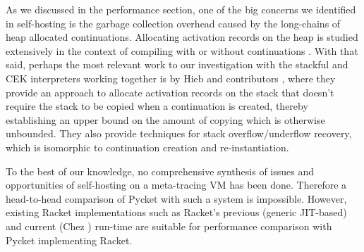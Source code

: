 As we discussed in the performance section, one of the big concerns we
identified in self-hosting is the garbage collection overhead caused
by the long-chains of heap allocated continuations. Allocating
activation records on the heap is studied extensively in the context
of compiling with \cite{comp-cont:07} or without
\cite{comp-without-cont:17} continuations \cite{whatever:19}. With
that said, perhaps the most relevant work to our investigation with
the stackful and CEK interpreters working together is by Hieb and
contributors \cite{cont-heap-stack:90}, where they provide an approach
to allocate activation records on the stack that doesn't require the
stack to be copied when a continuation is created, thereby
establishing an upper bound on the amount of copying which is
otherwise unbounded. They also provide techniques for stack
overflow/underflow recovery, which is isomorphic to continuation
creation and re-instantiation.

To the best of our knowledge, no comprehensive synthesis of issues and
opportunities of self-hosting on a meta-tracing VM has been
done. Therefore a head-to-head comparison of Pycket with such a system
is impossible. However, existing Racket implementations such as
Racket's previous (generic JIT-based) and current (Chez
\cite{racket-on-chez-19}) run-time are suitable for performance
comparison with Pycket implementing Racket.



